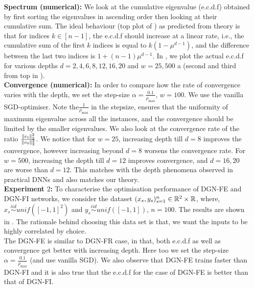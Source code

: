 \textbf{Spectrum (numerical):} We look at the cumulative eigenvalue (e.c.d.f) obtained by first sorting the eigenvalues in ascending order then looking at their cumulative sum. The ideal behaviour (top plot of ) as predicted from theory is that for indices $k\in[n-1]$, the e.c.d.f should increase at a linear rate, i.e., the cumulative sum of the first $k$ indices is equal to $k(1-\mu^{d-1})$, and the difference between the last two indices is $1+(n-1)\mu^{d-1}$. In , we plot the actual e.c.d.f for various depths $d=2,4,6,8,12,16,20$ and $w=25,500$ a (second and third from top in ). \hfill\\
\textbf{Convergence (numerical):} In order to compare how the rate of convergence varies with the depth, we set the step-size $\alpha=\frac{0.1}{\rho_{\max}}$, $w=100$. We use the vanilla SGD-optimiser. Note the$ \frac{1}{\rho_{\max}}$ in the stepsize, ensures that the uniformity of maximum eigenvalue across all the instances, and the convergence should be limited by the smaller eigenvalues. We also look at the convergence rate of the ratio $\frac{\|e_t\|^2_2}{\|e_0\|^2_2}$. We notice that for $w=25$, increasing depth till $d=8$ improves the convergence, however increasing beyond $d=8$ worsens the convergence rate. For $w=500$, increasing the depth till $d=12$ improves convergence, and $d=16,20$ are worse than $d=12$.  This matches with the depth phenomena observed in practical DNNs and also matches our theory.\\
\textbf{Experiment $2$:} To characterise the optimisation performance of DGN-FE and DGN-FI networks, we consider the dataset $(x_s,y_s)_{s=1}^{n}\in \mathbb{R}^2\times \mathbb{R}$, where, $x_s\stackrel{iid}\sim unif(\left[-1,1\right]^2)$ and $y_s\stackrel{iid}\sim unif([-1,1])$, $n=100$. The results are shown in . The rationale behind choosing this data set is that, we want the inputs to be highly correlated by choice.\\
The DGN-FE is similar to DGN-FR case, in that, both e.c.d.f as well as convergence get better with increasing depth. Here too we set the step-size $\alpha=\frac{0.1}{\rho_{\max}}$ (and use vanilla SGD). We also observe that DGN-FE trains faster than DGN-FI and it is also true that the e.c.d.f for the case of  DGN-FE is better than that of DGN-FI. %
